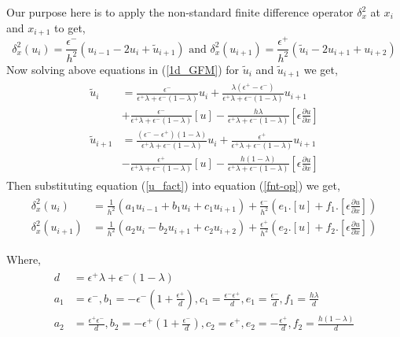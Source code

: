 Our purpose here is to apply the non-standard finite difference operator $\delta_x^2$ at $x_i$ and $x_{i+1}$ to get, 
\begin{equation}
\delta_x^2\left(u_{i}\right)= \frac{\epsilon^-}{h^2} \left(u_{i-1}-2u_{i}+\tilde{u}_{i+1}\right)\text{ and }\delta_x^2\left(u_{i+1}\right)= \frac{\epsilon^+}{h^2} \left(\tilde{u}_{i}-2u_{i+1}+u_{i+2}\right)	\label{fnt-op}
\end{equation}
Now solving above equations in (\ref{1d_GFM})  for $\tilde{u}_i $ and $\tilde{u}_{i+1}$ we get, 
\begin{eqnarray}
\begin{aligned}
	\tilde{u}_i&= \frac{\epsilon^-}{\epsilon^+\lambda+\epsilon^-(1-\lambda)}u_i +\frac{\lambda(\epsilon^+-\epsilon^-)}{\epsilon^+\lambda+\epsilon^-(1-\lambda)}u_{i+1}\\ &+\frac{\epsilon^-}{\epsilon^+\lambda+\epsilon^-(1-\lambda)}\left[u\right] -\frac{h \lambda}{\epsilon^+\lambda+\epsilon^-(1-\lambda)}\left[ \epsilon \frac{\partial u}{\partial x} \right]\\
	\tilde{u}_{i+1}&= \frac{(\epsilon^--\epsilon^+)(1-\lambda)}{\epsilon^+\lambda+\epsilon^-(1-\lambda)} u_i +\frac{\epsilon^+}{\epsilon^+\lambda+\epsilon^-(1-\lambda)} u_{i+1} \\
	& -\frac{\epsilon^+}{\epsilon^+\lambda+\epsilon^-(1-\lambda)} \left[u\right] -\frac{h(1-\lambda)}{\epsilon^+\lambda+\epsilon^-(1-\lambda)}\left[ \epsilon \frac{\partial u}{\partial x} \right]\label{u_fact}
\end{aligned}
\end{eqnarray}
Then substituting equation (\ref{u_fact}) into equation (\ref{fnt-op}) we get, 
\begin{eqnarray}
	\begin{aligned}
		\delta_x^2\left(u_{i}\right)&= \frac{1}{h^2} \left(a_1u_{i-1}+b_1 u_{i}+c_1u_{i+1}\right)+\frac{\epsilon^-}{h^2}\left(e_1.[u]+f_1.\left[ \epsilon \frac{\partial u}{\partial x} \right]\right)\\
		\delta_x^2\left(u_{i+1}\right)&= \frac{1}{h^2} \left(a_2u_{i}-b_2u_{i+1}+c_2u_{i+2}\right)+\frac{\epsilon^+}{h^2}\left(e_2.[u]+f_2.\left[ \epsilon \frac{\partial u}{\partial x} \right]\right)
	\end{aligned}\label{fnt-op-2}
\end{eqnarray}
 
Where,
\begin{eqnarray}
\begin{aligned}
d&=\epsilon^+\lambda+\epsilon^-(1-\lambda)\\
a_1&= \epsilon^-,b_1=-\epsilon^-\left(1+\frac{\epsilon^+}{d}\right), c_1=\frac{\epsilon^-\epsilon^+}{d}, e_1=\frac{\epsilon^-}{d},f_1=\frac{h\lambda}{d}\\
a_2&= \frac{\epsilon^+\epsilon^-}{d},b_2=-\epsilon^+\left(1+\frac{\epsilon^-}{d}\right), c_2=\epsilon^+, e_2=-\frac{\epsilon^+}{d},f_2=\frac{h(1-\lambda)}{d}
\end{aligned}
\end{eqnarray}

